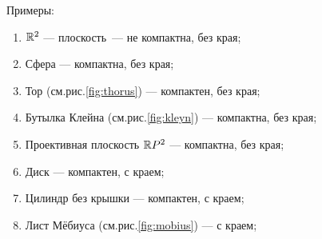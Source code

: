 Примеры:
\begin{enumerate}
    \item $\mathbb{R}^2$ — плоскость — не компактна, без края;
    \item Сфера — компактна, без края;
    \item Тор (см.рис.\ref{fig:thorus}) — компактен, без края;
    \item Бутылка Клейна (см.рис.\ref{fig:kleyn}) — компактна, без края;
    \item Проективная плоскость $\mathbb{R} P^2$ — компактна, без края;
    \item Диск — компактен, с краем;
    \item Цилиндр без крышки — компактен, с краем;
    \item Лист Мёбиуса (см.рис.\ref{fig:mobius}) — с краем;
\end{enumerate}


